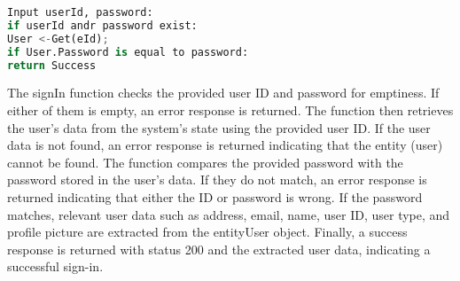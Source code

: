 \begin{lstlisting}[language=Python , caption=User signin]
Input userId, password:
if userId andr password exist:
User <-Get(eId); 
if User.Password is equal to password:
return Success
\end{lstlisting}
The signIn function checks the provided user ID and password for emptiness. If either of them is empty, an error response is returned. The function then retrieves the user's data from the system's state using the provided user ID. If the user data is not found, an error response is returned indicating that the entity (user) cannot be found. The function compares the provided password with the password stored in the user's data. If they do not match, an error response is returned indicating that either the ID or password is wrong. If the password matches, relevant user data such as address, email, name, user ID, user type, and profile picture are extracted from the entityUser object. Finally, a success response is returned with status 200 and the extracted user data, indicating a successful sign-in.
